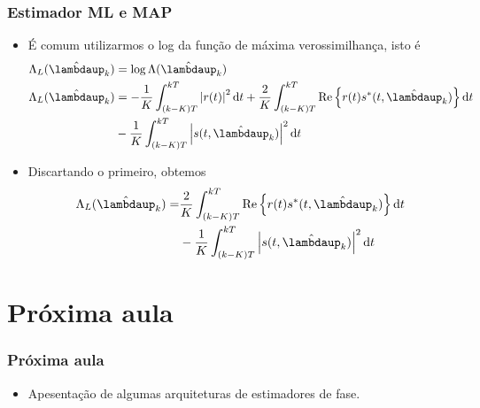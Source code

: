 \begin{frame}[t]
    \frametitle{Estimador ML e MAP}
    \begin{itemize}
        \item É comum utilizarmos o log da função de máxima verossimilhança, isto é
        \begin{align}
            \Lambda_L(\hat{\boldsymbol{\lambdaup}}_{k}) & = \log{\Lambda(\hat{\boldsymbol{\lambdaup}}_{k})} \\
            \Lambda_L(\hat{\boldsymbol{\lambdaup}}_{k}) & = - \frac{1}{K} \int_{(k-K)T}^{kT} \abs{r(t)}^{2} \diff{t} + \frac{2}{K} \int_{(k-K)T}^{kT} \textnormal{Re}\left\{r(t)s^*(t, \hat{\boldsymbol{\lambdaup}}_{k})\right\} \diff{t} \nonumber \\
            & - \frac{1}{K} \int_{(k-K)T}^{kT} \abs{s(t, \hat{\boldsymbol{\lambdaup}}_{k})}^{2} \diff{t}
        \end{align}
        \item Discartando o primeiro, obtemos
        \begin{align}
            \Lambda_L(\hat{\boldsymbol{\lambdaup}}_{k}) = & \frac{2}{K} \int_{(k-K)T}^{kT} \textnormal{Re}\left\{r(t)s^*(t, \hat{\boldsymbol{\lambdaup}}_{k})\right\} \diff{t} \nonumber \\ & - \frac{1}{K} \int_{(k-K)T}^{kT} \abs{s(t, \hat{\boldsymbol{\lambdaup}}_{k})}^{2} \diff{t}
        \end{align}
    \end{itemize}
\end{frame}

\section{Próxima aula}
\begin{frame}[t]
    \frametitle{Próxima aula}

    \begin{itemize}
        \item Apesentação de algumas arquiteturas de estimadores de fase.
    \end{itemize}
\end{frame}